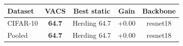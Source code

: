 \begin{tabular}{lcccc}
\toprule
Dataset & VACS & Best static & Gain & Backbone \\
\midrule
CIFAR-10 & \textbf{64.7} & Herding 64.7 & +0.00 & resnet18 \\
Pooled & \textbf{64.7} & Herding 64.7 & +0.00 & resnet18 \\
\bottomrule
\end{tabular}
